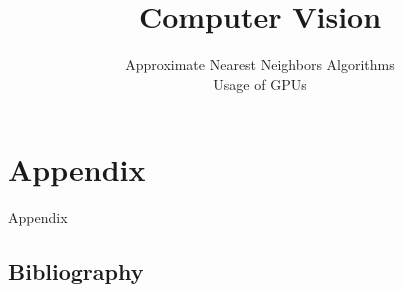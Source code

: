 
\title{Computer Vision}
\subtitle{Approximate Nearest Neighbors Algorithms \\ Usage of GPUs}




	
	

%	

%	
	
%	
	
	
	
	\section*{Appendix}
	\begin{frame}
		\Huge
		Appendix
	\end{frame}
%	
	\subsection*{Bibliography}
		
	
		
